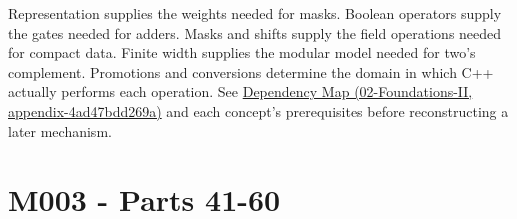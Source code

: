 Representation supplies the weights needed for masks. Boolean operators supply the gates needed for adders. Masks and shifts supply the field operations needed for compact data. Finite width supplies the modular model needed for two's complement. Promotions and conversions determine the domain in which C++ actually performs each operation. See \href{../02-Foundations-II/main.pdf\#nameddest=appendix-4ad47bdd269a}{Dependency Map (02-Foundations-II, appendix-4ad47bdd269a)} and each concept's prerequisites before reconstructing a later mechanism.

\section{M003 - Parts 41-60}\label{appendix-fd090d982a15-m003---parts-41-60}

